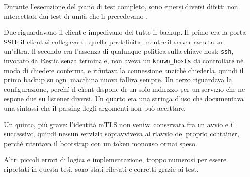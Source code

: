 Durante l'esecuzione del piano di test completo, sono emersi diversi difetti non 
intercettati dai test di unità che li precedevano \cite{ramusb-known-issues}.

Due riguardavano il client e impedivano del tutto il backup. Il primo era la porta SSH: il client si
collegava su quella predefinita, mentre il server ascolta su un'altra. Il secondo era l'assenza di
qualunque politica sulla chiave host: \texttt{ssh}, invocato da Restic senza terminale, non aveva un
\texttt{known\_hosts} da controllare né modo di chiedere conferma, e rifiutava la connessione anziché
chiederla, quindi il primo backup su ogni macchina nuova falliva sempre. Un terzo riguardava la configurazione,
perché il client dispone di un solo indirizzo per un servizio che ne espone due su listener diversi. Un
quarto era una stringa d'uso che documentava una sintassi che il parsing degli argomenti non può accettare.

Un quinto, più grave: l'identità mTLS non veniva conservata fra un avvio e il successivo, quindi
nessun servizio sopravviveva al riavvio del proprio container, perché ritentava il bootstrap con un token
monouso ormai speso.

Altri piccoli errori di logica e implementazione, troppo numerosi per essere riportati in questa tesi, 
sono stati rilevati e corretti grazie ai test.